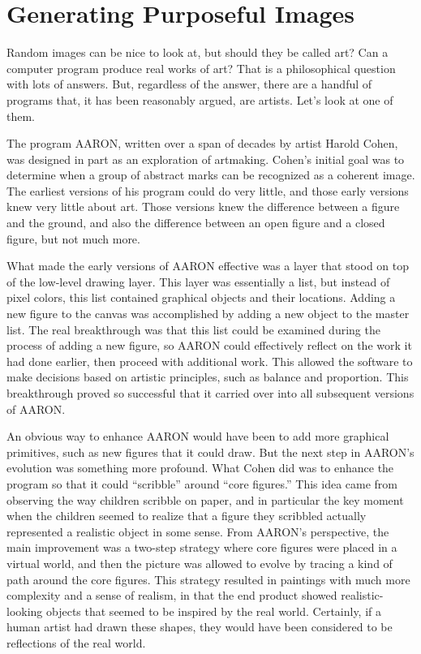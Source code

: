 \section{Generating Purposeful Images}

Random images can be nice to look at, but should they be called art?
Can a computer program produce real works of art?
That is a philosophical question with lots of answers.
But, regardless of the answer,
there are a handful of programs that, it has been reasonably argued,
are artists. Let's look at one of them.

The program AARON,
written over a span of decades by artist Harold Cohen,
was designed in part as an exploration of artmaking. Cohen's
initial goal was to determine when a group of abstract marks can
be recognized as a coherent image. The earliest versions of his program
could do very little, and those early versions knew very little about art.
Those versions knew the difference between a figure and the ground, and also
the difference between an open figure and a closed figure, but
not much more.

What made the early versions of AARON effective was a layer that
stood on top of the low-level drawing layer. This layer was essentially
a list, but instead of pixel colors, this list contained graphical objects
and their locations. Adding a new figure to the canvas was accomplished
by adding a new object to the master list. The real breakthrough was
that this list could be examined during the process of adding
a new figure, so AARON could effectively reflect on the work it had
done earlier, then proceed with additional work.
This allowed the software to make decisions based on
artistic principles, such as balance and proportion.
This breakthrough proved so successful
that it carried over into all subsequent versions of AARON.

An obvious way to enhance AARON would have been to add more graphical
primitives, such as new figures that it could draw. But
the next step in AARON's evolution was something more profound. What
Cohen did was to enhance the program so that it could ``scribble'' around
``core figures.'' This idea came from observing the way children
scribble on paper, and in particular the key moment when the children
seemed to realize that a figure they scribbled actually represented a
realistic object in some sense. From AARON's perspective, the main improvement
was a two-step strategy where core figures
were placed in a virtual world,
and then the picture was allowed to evolve by tracing a kind of path
around the core figures.
This strategy resulted in paintings with much more complexity
and a sense of realism, in that the end product showed realistic-looking
objects that seemed to be inspired by the real world. Certainly, if a
human artist had drawn these shapes, they would have been considered to be
reflections of the real world.

